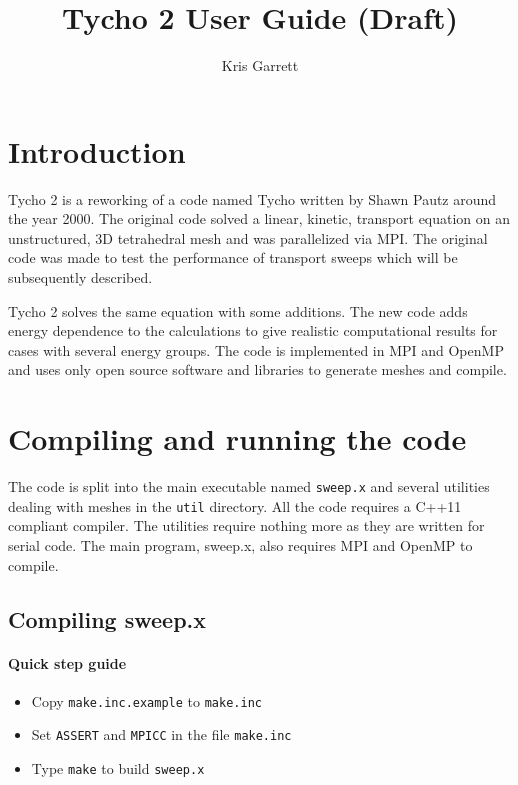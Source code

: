\documentclass[12pt,letterpaper]{article}
\author{Kris Garrett}
\title{Tycho 2 User Guide (Draft)}
\begin{document}
\maketitle


\section{Introduction}
Tycho 2 is a reworking of a code named Tycho written by Shawn Pautz around the year 2000.
The original code solved a linear, kinetic, transport equation on an unstructured, 3D tetrahedral mesh and was parallelized via MPI.
The original code was made to test the performance of transport sweeps which will be subsequently described.

Tycho 2 solves the same equation with some additions.
The new code adds energy dependence to the calculations to give realistic computational results for cases with several energy groups.
The code is implemented in MPI and OpenMP and uses only open source software and libraries to generate meshes and compile.







\section{Compiling and running the code}
The code is split into the main executable named {\tt sweep.x} and several utilities dealing with meshes in the {\tt util} directory.
All the code requires a C++11 compliant compiler.
The utilities require nothing more as they are written for serial code.
The main program, sweep.x, also requires MPI and OpenMP to compile.

\subsection{Compiling sweep.x}
\paragraph{Quick step guide}
\begin{itemize}
\item Copy {\tt make.inc.example} to {\tt make.inc}
\item Set {\tt ASSERT} and {\tt MPICC} in the file {\tt make.inc}
\item Type {\tt make} to build {\tt sweep.x}
\end{itemize}
\end{document}
